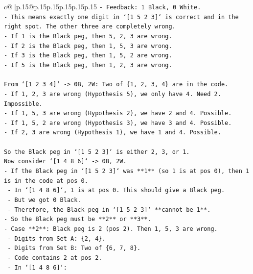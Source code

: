 \documentclass{article}
\begin{document}
{\begin{supertabular}{c@{$\;$}|p{.15\linewidth}@{}p{.15\linewidth}p{.15\linewidth}p{.15\linewidth}p{.15\linewidth}p{.15\linewidth}}
{{{\texttt{{-} Feedback: 1 Black, 0 White.} \\
\texttt{{-} This means exactly one digit in `{[}1 5 2 3{]}` is correct and in the right spot. The other three are completely wrong.} \\
\texttt{{-} If 1 is the Black peg, then 5, 2, 3 are wrong.} \\
\texttt{{-} If 2 is the Black peg, then 1, 5, 3 are wrong.} \\
\texttt{{-} If 3 is the Black peg, then 1, 5, 2 are wrong.} \\
\texttt{{-} If 5 is the Black peg, then 1, 2, 3 are wrong.} \\
\\ 
\texttt{From `{[}1 2 3 4{]}` {-}> 0B, 2W: Two of \{1, 2, 3, 4\} are in the code.} \\
\texttt{{-} If 1, 2, 3 are wrong (Hypothesis 5), we only have 4. Need 2. Impossible.} \\
\texttt{{-} If 1, 5, 3 are wrong (Hypothesis 2), we have 2 and 4. Possible.} \\
\texttt{{-} If 1, 5, 2 are wrong (Hypothesis 3), we have 3 and 4. Possible.} \\
\texttt{{-} If 2, 3 are wrong (Hypothesis 1), we have 1 and 4. Possible.} \\
\\ 
\texttt{So the Black peg in `{[}1 5 2 3{]}` is either 2, 3, or 1.} \\
\texttt{Now consider `{[}1 4 8 6{]}` {-}> 0B, 2W.} \\
\texttt{{-} If the Black peg in `{[}1 5 2 3{]}` was **1** (so 1 is at pos 0), then 1 is in the code at pos 0.} \\
\texttt{    {-} In `{[}1 4 8 6{]}`, 1 is at pos 0. This should give a Black peg.} \\
\texttt{    {-} But we got 0 Black.} \\
\texttt{    {-} Therefore, the Black peg in `{[}1 5 2 3{]}` **cannot be 1**.} \\
\texttt{{-} So the Black peg must be **2** or **3**.} \\
\texttt{{-} Case **2**: Black peg is 2 (pos 2). Then 1, 5, 3 are wrong.} \\
\texttt{    {-} Digits from Set A: \{2, 4\}.} \\
\texttt{    {-} Digits from Set B: Two of \{6, 7, 8\}.} \\
\texttt{    {-} Code contains 2 at pos 2.} \\
\texttt{    {-} In `{[}1 4 8 6{]}`:} \\
}}}
\end{supertabular}}
\end{document}
